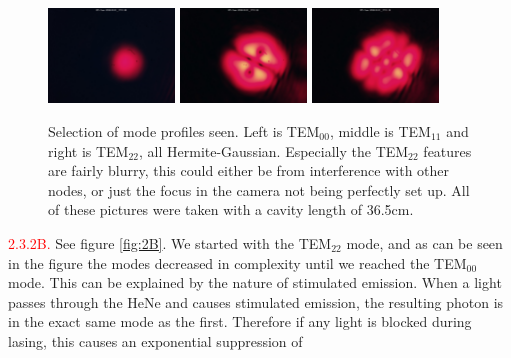 \documentclass[letterpaper, reqno,11pt]{article}
\begin{document}
\begin{figure}[tb]
    \centering
    \includegraphics[width=0.3\textwidth]{data/2A/im_0228_20240301_175138.jpg}
    \includegraphics[width=0.3\textwidth]{data/2A/im_0224_20240301_175122.jpg}
    \includegraphics[width=0.3\textwidth]{data/2A/im_0223_20240301_175118.jpg}
    \caption{Selection of mode profiles seen. Left is TEM$_{00}$, middle is TEM$_{11}$ and right is TEM$_{22}$, all Hermite-Gaussian. Especially the TEM$_{22}$ features are fairly blurry, this could either be from interference with other nodes, or just the focus in the camera not being perfectly set up. All of these pictures were taken with a cavity length of 36.5cm.}
    \label{fig:2A}
\end{figure}

\noindent \textcolor{red}{2.3.2B.} See figure \ref{fig:2B}. We started with the TEM$_{22}$ mode, and as can be seen in the figure the modes decreased in complexity until we reached the TEM$_{00}$ mode. This can be explained by the nature of stimulated emission. When a light passes through the HeNe and causes stimulated emission, the resulting photon is in the exact same mode as the first. Therefore if any light is blocked during lasing, this causes an exponential suppression of 
\end{document}
